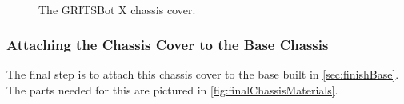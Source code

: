 \begin{figure}[h!]
\centering
{}
\hfill
{}\\
\caption{The GRITSBot X chassis cover.}
\label{fig:topChassisAssembled}
\end{figure}

\subsubsection{Attaching the Chassis Cover to the Base Chassis}
\label{sec:attachChassisTop}

The final step is to attach this chassis cover to the base built in \cref{sec:finishBase}. The parts needed for this are pictured in \cref{fig:finalChassisMaterials}.

